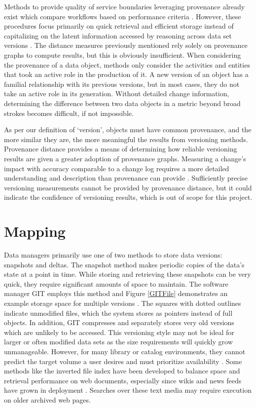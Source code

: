Methods to provide quality of service boundaries leveraging provenance already exist which compare workflows based on performance criteria \cite{2015:CAA:2778374.2778504}.
However, these procedures focus primarily on quick retrieval and efficient storage instead of capitalizing on the latent information accessed by reasoning across data set versions \cite{tan2004research}.
The distance measures previously mentioned rely solely on provenance graphs to compute results, but this is obviously insufficient.
When considering the provenance of a data object, methods only consider the activities and entities that took an active role in the production of it.
A new version of an object has a familial relationship with its previous versions, but in most cases, they do not take an active role in its generation.
Without detailed change information, determining the difference between two data objects in a metric beyond broad strokes becomes difficult, if not impossible.

As per our definition of `version', objects must have common provenance, and the more similar they are, the more meaningful the results from versioning methods.
Provenance distance provides a means of determining how reliable versioning results are given a greater adoption of provenance graphs.
Measuring a change's impact with accuracy comparable to a change log requires a more detailed understanding and description than provenance can provide  \cite{Bose:2005:LRS:1057977.1057978}.
Sufficiently precise versioning measurements cannot be provided by provenance distance, but it could indicate the confidence of versioning results, which is out of scope for this project.

\section{Mapping}

Data managers primarily use one of two methods to store data versions: snapshots and deltas.
The snapshot method makes periodic copies of the data's state at a point in time.
While storing and retrieving these snapshots can be very quick, they require significant amounts of space to maintain.
The software manager GIT employs this method and Figure \ref{GITFile} demonstrates an example storage space for multiple versions \cite{Chacon:2009:PG:1618548}.
The squares with dotted outlines indicate unmodified files, which the system stores as pointers instead of full objects.
In addition, GIT compresses and separately stores very old versions which are unlikely to be accessed.
This versioning style may not be ideal for larger or often modified data sets as the size requirements will quickly grow unmanageable.
However, for many library or catalog environments, they cannot predict the target volume a user desires and must prioritize availability \cite{Payette2002} \cite{Barkstrom_digitallibrary}.
Some methods like the inverted file index have been developed to balance space and retrieval performance on web documents, especially since wikis and news feeds have grown in deployment \cite{Berberich:2007:TMT:1277741.1277831}.
Searches over these text media may require execution on older archived web pages.

